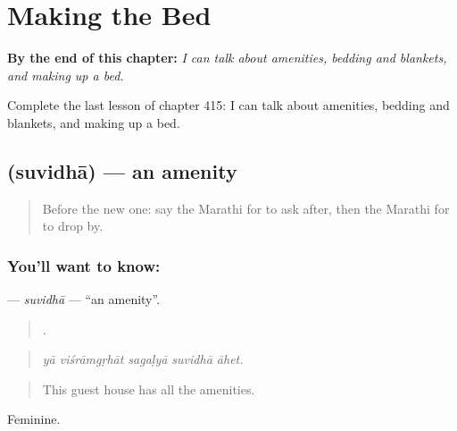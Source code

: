 
\chapter{Making the Bed}
\label{ch:mr-making-the-bed}

\begin{chapteropening}
\textbf{By the end of this chapter:} \emph{I can talk about amenities, bedding and blankets, and making up a bed.}

Complete the last lesson of chapter 415: I can talk about amenities, bedding and blankets, and making up a bed.
\end{chapteropening}

\section[\texorpdfstring{\mr{सुविधा} (suvidhā)}{सुविधा (suvidhā)}]{ (suvidhā) — an amenity}

\label{lesson:MR-C415-suvidha}



\begin{quote}
Before the new one: say the Marathi for to ask after, then the Marathi for to drop by.
\end{quote}

\subsection*{You'll want to know: }
\textbf{} — \emph{suvidhā} — \textquotedblleft{}an amenity\textquotedblright{}.

\begin{quote}
    .
\end{quote}

\begin{quote}
\emph{yā viśrāmgṛhāt sagaḷyā suvidhā āhet.}
\end{quote}

\begin{quote}
This guest house has all the amenities.
\end{quote}

Feminine.

